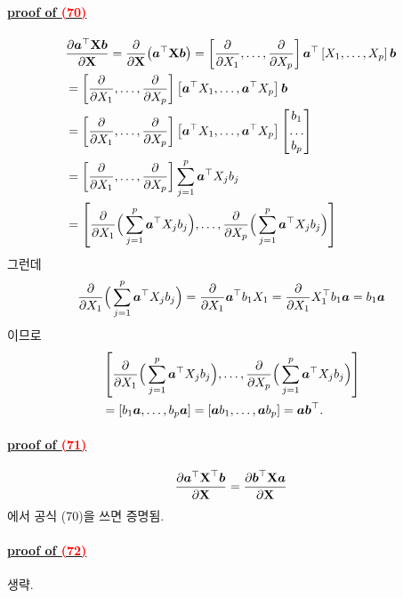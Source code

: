 \documentclass[12pt,oneside,english,a4paper]{article}
\newcommand{\bsa}{\mbox{\boldmath $a$}}
\newcommand{\bsb}{\mbox{\boldmath $b$}}
\newcommand{\bfX}{\mbox{$\bf{X}$}}
\begin{document}
\paragraph{\Large\underline{proof of \textcolor{red}{(70)}}}
\begin{align*}
&\frac{\partial\bsa^\top\bfX\bsb}{\partial\bfX}=\frac{\partial}{\partial\bfX}\big(\bsa^\top\bfX\bsb\big)=\left[\frac{\partial}{\partial X_1},\dots,\frac{\partial}{\partial X_p}\right]\bsa^\top\left[X_1,\dots,X_p\right]\bsb \\
&=\left[\frac{\partial}{\partial X_1},\dots,\frac{\partial}{\partial X_p}\right]\left[\bsa^\top X_1,\dots,\bsa^\top X_p\right]\bsb\\
&=\left[\frac{\partial}{\partial X_1},\dots,\frac{\partial}{\partial X_p}\right]\left[\bsa^\top X_1,\dots,\bsa^\top X_p\right]\begin{bmatrix}b_1 \\ \dots \\ b_p\end{bmatrix}\\
&=\left[\frac{\partial}{\partial X_1},\dots,\frac{\partial}{\partial X_p}\right]\sum_{j=1}^{p}\bsa^\top X_jb_j\\ 
&=\left[\frac{\partial}{\partial X_1}\Big(\sum_{j=1}^{p}\bsa^\top X_jb_j\Big),\dots,\frac{\partial}{\partial X_p}\Big(\sum_{j=1}^{p}\bsa^\top X_jb_j\Big)\right]
\end{align*}
그런데 
\[
\frac{\partial}{\partial X_1}\Big(\sum_{j=1}^{p}\bsa^\top X_jb_j\Big)=\frac{\partial}{\partial X_1}\bsa^\top b_1X_1=\frac{\partial}{\partial X_1}X_1^\top b_1 \bsa=b_1\bsa
\]
이므로 
\begin{align*}
& \left[\frac{\partial}{\partial X_1}\Big(\sum_{j=1}^{p}\bsa^\top X_jb_j\Big),\dots,\frac{\partial}{\partial X_p}\Big(\sum_{j=1}^{p}\bsa^\top X_jb_j\Big)\right] \\ 
&=\left[b_1\bsa,\dots,b_p\bsa\right]=\left[\bsa b_1,\dots,\bsa b_p\right]=\bsa\bsb^\top.
\end{align*}

\paragraph{\Large\underline{proof of \textcolor{red}{(71)}}}
\[
\frac{\partial\bsa^\top\bfX^\top\bsb}{\partial\bfX}=\frac{\partial\bsb^\top\bfX\bsa}{\partial\bfX}
\]
에서 공식 (70)을 쓰면 증명됨. 

\paragraph{\Large\underline{proof of \textcolor{red}{(72)}}}
생략.
\end{document}
